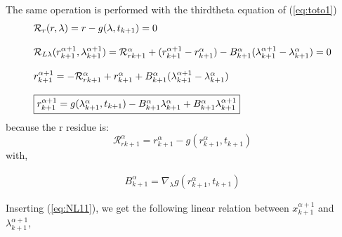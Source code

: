 The same operation is performed with the thirdtheta equation of (\ref{eq:toto1})
\begin{equation}
   \label{eq:NL9}
   \begin{array}{l}
      \mathcal R_r(r,\lambda)=r-g(\lambda,t_{k+1}) =0\\ \\
      \mathcal R_{L\lambda}(r^{\alpha+1}_{k+1},\lambda^{\alpha+1}_{k+1}) = \mathcal
      R_{rk+1}^{\alpha} + (r^{\alpha+1}_{k+1} - r^{\alpha}_{k+1}) -
      B^{\alpha}_{k+1}(\lambda^{\alpha+1}_{k+1} -
      \lambda^{\alpha}_{k+1})=0\\ \\

      r^{\alpha+1}_{k+1} = - \mathcal R_{rk+1}^{\alpha} + r^{\alpha}_{k+1} + B^{\alpha}_{k+1}(\lambda^{\alpha+1}_{k+1} -
      \lambda^{\alpha}_{k+1})\\ \\
      \fbox{$r^{\alpha+1}_{k+1} = g(\lambda ^{\alpha}_{k+1},t_{k+1}) -B^{\alpha}_{k+1}
      \lambda^{\alpha}_{k+1} + B^{\alpha}_{k+1} \lambda^{\alpha+1}_{k+1}$}       
 \end{array}
\end{equation}
because the r residue is:
\begin{equation}
\mathcal
      R_{rk+1}^{\alpha} = r^{\alpha}_{k+1} - g(r^{\alpha}_{k+1},t_{k+1})
  \end{equation}
with,

\begin{equation}
     \begin{array}{l}
  B^{\alpha}_{k+1} = \nabla_{\lambda}g(r^{\alpha}_{k+1},t_{k+1})
 \end{array}
\end{equation}

Inserting (\ref{eq:NL11}), we get the following linear relation between $x^{\alpha+1}_{k+1}$ and
$\lambda^{\alpha+1}_{k+1}$, 

